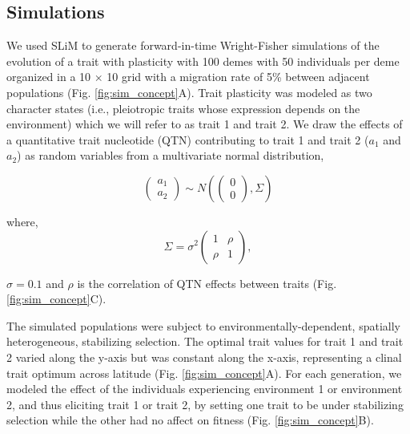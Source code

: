 \documentclass[11pt,letterpaper]{article}
\begin{document}
\subsection*{Simulations}
We used SLiM \citep{haller2025slim} to generate forward-in-time Wright-Fisher simulations of the evolution of a trait with plasticity with 100 demes with 50 individuals per deme organized in a 10 $\times$ 10 grid with a migration rate of 5\% between adjacent populations (Fig. \ref{fig:sim_concept}A). 
Trait plasticity was modeled as two character states (i.e., pleiotropic traits whose expression depends on the environment) which we will refer to as trait 1 and trait 2. 
We draw the effects of a quantitative trait nucleotide (QTN) contributing to trait 1 and trait 2 ($a_1$ and $a_2$) as random variables from a multivariate normal distribution,

\begin{equation}
    \begin{pmatrix} a_1 \\ a_2 \end{pmatrix} \sim N\left(\begin{pmatrix} 0 \\ 0 \end{pmatrix}, \Sigma\right)
\end{equation}

where,
\begin{equation}
\Sigma = \sigma^2 \begin{pmatrix} 1 & \rho \\ \rho & 1 \end{pmatrix},
\end{equation}

$\sigma = 0.1$ and $\rho$ is the correlation of QTN effects between traits (Fig. \ref{fig:sim_concept}C).

The simulated populations were subject to environmentally-dependent, spatially heterogeneous, stabilizing selection. 
The optimal trait values for trait 1 and trait 2 varied along the y-axis but was constant along the x-axis, representing a clinal trait optimum across latitude (Fig. \ref{fig:sim_concept}A).
For each generation, we modeled the effect of the individuals experiencing environment 1 or environment 2, and thus eliciting trait 1 or trait 2, by setting one trait to be under stabilizing selection while the other had no affect on fitness (Fig. \ref{fig:sim_concept}B). 
\end{document}
